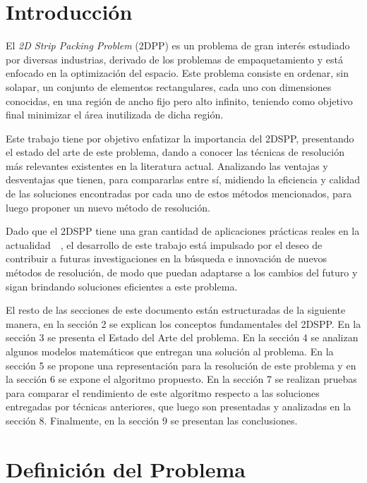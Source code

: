 \documentclass[letter, 10pt]{article}
\begin{document}
\section{Introducci\'on}

El \emph{2D Strip Packing Problem} (2DPP) es un problema de gran inter\'es estudiado por diversas industrias, derivado de los problemas de empaquetamiento y est\'a enfocado en la optimizaci\'on del espacio. Este problema consiste en ordenar, sin solapar, un conjunto de elementos rectangulares, cada uno con dimensiones conocidas, en una regi\'on de ancho fijo pero alto infinito, teniendo como objetivo final minimizar el \'area inutilizada de dicha regi\'on.

Este trabajo tiene por objetivo enfatizar la importancia del 2DSPP, presentando el estado del arte de este problema, dando a conocer las t\'ecnicas de resoluci\'on m\'as relevantes existentes en la literatura actual. Analizando las ventajas y desventajas que tienen, para compararlas entre s\'i, midiendo la eficiencia y calidad de las soluciones encontradas por cada uno de estos m\'etodos mencionados, para luego proponer un nuevo m\'etodo de resoluci\'on.

Dado que el 2DSPP tiene una gran cantidad de aplicaciones pr\'acticas reales en la actualidad~\cite{junior2022rectangular}~\cite{vasilyev2023generalized}, el desarrollo de este trabajo est\'a impulsado por el deseo de contribuir a futuras investigaciones en la b\'usqueda e innovaci\'on de nuevos m\'etodos de resoluci\'on, de modo que puedan adaptarse a los cambios del futuro y sigan brindando soluciones eficientes a este problema.

El resto de las secciones de este documento est\'an estructuradas de la siguiente manera, en la secci\'on 2 se explican los conceptos fundamentales del 2DSPP. En la secci\'on 3 se presenta el Estado del Arte del problema. En la secci\'on 4 se analizan algunos modelos matem\'aticos que entregan una soluci\'on al problema. En la secci\'on 5 se propone una representaci\'on para la resoluci\'on de este problema y en la secci\'on 6 se expone el algoritmo propuesto. En la secci\'on 7 se realizan pruebas para comparar el rendimiento de este algoritmo respecto a las soluciones entregadas por t\'ecnicas anteriores, que luego son presentadas y analizadas en la secci\'on 8. Finalmente, en la secci\'on 9 se presentan las conclusiones.

\section{Definici\'on del Problema}
\end{document}

